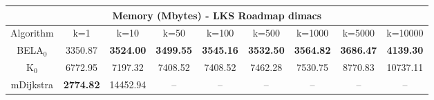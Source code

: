 \begin{tabular}{c|cccccccc}\toprule
\multicolumn{9}{c}{Memory (Mbytes) - LKS Roadmap dimacs}\\ \midrule
Algorithm & k=1 & k=10 & k=50 & k=100 & k=500 & k=1000 & k=5000 & k=10000 \\ \midrule
BELA$_0$ & 3350.87 & \textbf{3524.00} & \textbf{3499.55} & \textbf{3545.16} & \textbf{3532.50} & \textbf{3564.82} & \textbf{3686.47} & \textbf{4139.30} \\
K$_0$ & 6772.95 & 7197.32 & 7408.52 & 7408.52 & 7462.28 & 7530.75 & 8770.83 & 10737.11 \\
mDijkstra & \textbf{2774.82} & 14452.94 & -- & -- & -- & -- & -- & -- \\ \bottomrule 
\end{tabular}

